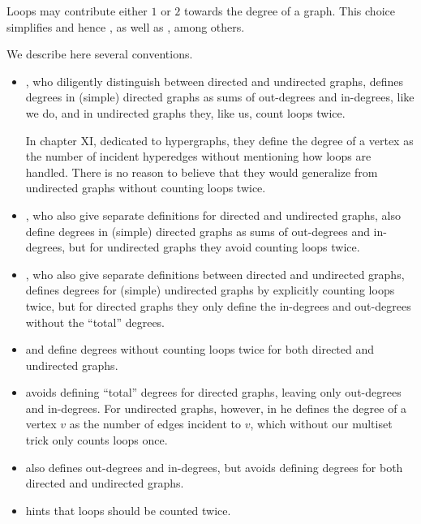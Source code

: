 \begin{remark}\label{rem:counting_loops_twice}
  Loops may contribute either \( 1 \) or \( 2 \) towards the degree of a graph. This choice simplifies  and hence , as well as , among others.

  We describe here several conventions.
  \begin{itemize}
    \item {}, who diligently distinguish between directed and undirected graphs, defines degrees in (simple) directed graphs as sums of out-degrees and in-degrees, like we do, and in undirected graphs they, like us, count loops twice.

    In chapter XI, dedicated to hypergraphs, they define the degree of a vertex as the number of incident hyperedges without mentioning how loops are handled. There is no reason to believe that they would generalize from undirected graphs without counting loops twice.

    \item {}, who also give separate definitions for directed and undirected graphs, also define degrees in (simple) directed graphs as sums of out-degrees and in-degrees, but for undirected graphs they avoid counting loops twice.

    \item {}, who also give separate definitions between directed and undirected graphs, defines degrees for (simple) undirected graphs by explicitly counting loops twice, but for directed graphs they only define the in-degrees and out-degrees without the \enquote{total} degrees.

    \item {} and  define degrees without counting loops twice for both directed and undirected graphs.

    \item {} avoids defining \enquote{total} degrees for directed graphs, leaving only out-degrees and in-degrees. For undirected graphs, however, in \cite[def. 1.1.8]{Knauer2019AlgGraphTheory} he defines the degree of a vertex \( v \) as the number of edges incident to \( v \), which without our multiset trick only counts loops once.

    \item {} also defines out-degrees and in-degrees, but avoids defining degrees for both directed and undirected graphs.

    \item {} hints that loops should be counted twice.
  \end{itemize}
\end{remark}

